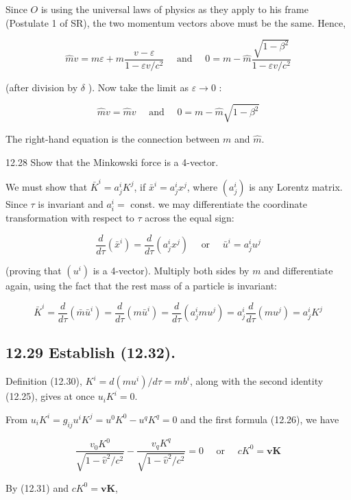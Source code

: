 \documentclass[10pt]{article}
\begin{document}
Since $O$ is using the universal laws of physics as they apply to his frame (Postulate 1 of SR), the two momentum vectors above must be the same. Hence,

$$
\hat{m} v=m \varepsilon+\hat{m} \frac{v-\varepsilon}{1-\varepsilon v / c^{2}} \quad \text { and } \quad 0=m-\hat{m} \frac{\sqrt{1-\beta^{2}}}{1-\varepsilon v / c^{2}}
$$

(after division by $\delta$ ). Now take the limit as $\varepsilon \rightarrow 0$ :

$$
\hat{m} v=\hat{m} v \quad \text { and } \quad 0=m-\hat{m} \sqrt{1-\beta^{2}}
$$

The right-hand equation is the connection between $m$ and $\hat{m}$.

12.28 Show that the Minkowski force is a 4-vector.

We must show that $\bar{K}^{i}=a_{j}^{i} K^{j}$, if $\bar{x}^{i}=a_{j}^{i} x^{j}$, where $\left(a_{j}^{i}\right)$ is any Lorentz matrix. Since $\tau$ is invariant and $a_{i}^{i}=$ const. we may differentiate the coordinate transformation with respect to $\tau$ across the equal sign:

$$
\frac{d}{d \tau}\left(\bar{x}^{i}\right)=\frac{d}{d \tau}\left(a_{j}^{i} x^{j}\right) \quad \text { or } \quad \bar{u}^{i}=a_{j}^{i} u^{j}
$$

(proving that $\left(u^{i}\right)$ is a 4-vector). Multiply both sides by $m$ and differentiate again, using the fact that the rest mass of a particle is invariant:

$$
\bar{K}^{i}=\frac{d}{d \tau}\left(\bar{m} \bar{u}^{i}\right)=\frac{d}{d \tau}\left(m \bar{u}^{i}\right)=\frac{d}{d \tau}\left(a_{j}^{i} m u^{j}\right)=a_{j}^{i} \frac{d}{d \tau}\left(m u^{j}\right)=a_{j}^{i} K^{j}
$$

\subsection*{12.29 Establish (12.32).}
Definition (12.30), $K^{i}=d\left(m u^{i}\right) / d \tau=m b^{i}$, along with the second identity (12.25), gives at once $u_{i} K^{i}=0$.

From $u_{i} K^{i}=g_{i j} u^{i} K^{j}=u^{0} K^{0}-u^{q} K^{q}=0$ and the first formula (12.26), we have

$$
\frac{v_{0} K^{0}}{\sqrt{1-\hat{v}^{2} / c^{2}}}-\frac{v_{q} K^{q}}{\sqrt{1-\hat{v}^{2} / c^{2}}}=0 \quad \text { or } \quad c K^{0}=\mathbf{v K}
$$

By (12.31) and $c K^{0}=\mathbf{v K}$,
\end{document}
